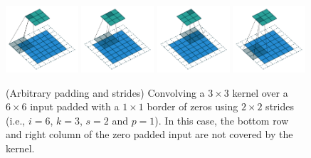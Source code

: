 \begin{figure}[p]
    \centering
    \includegraphics[width=0.24\textwidth]{pdf/padding_strides_odd_00.pdf}
    \includegraphics[width=0.24\textwidth]{pdf/padding_strides_odd_01.pdf}
    \includegraphics[width=0.24\textwidth]{pdf/padding_strides_odd_02.pdf}
    \includegraphics[width=0.24\textwidth]{pdf/padding_strides_odd_03.pdf}
    \caption{\label{fig:padding_strides_odd} (Arbitrary padding and strides)
        Convolving a $3 \times 3$ kernel over a $6 \times 6$ input padded with
        a $1 \times 1$ border of zeros using $2 \times 2$ strides (i.e.,
        $i = 6$, $k = 3$, $s = 2$ and $p = 1$). In this case, the bottom row
        and right column of the zero padded input are not covered by the
        kernel.}
\end{figure}

